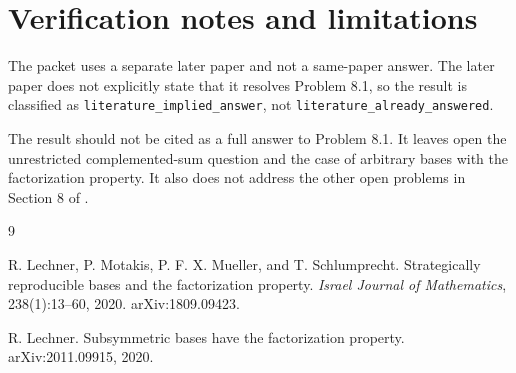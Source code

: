 \documentclass[11pt]{article}
\begin{document}
\section*{Verification notes and limitations}

The packet uses a separate later paper and not a same-paper answer.  The later
paper does not explicitly state that it resolves Problem 8.1, so the result is
classified as \texttt{literature\_implied\_answer}, not
\texttt{literature\_already\_answered}.

The result should not be cited as a full answer to Problem 8.1.  It leaves open
the unrestricted complemented-sum question and the case of arbitrary bases with
the factorization property.  It also does not address the other open problems
in Section 8 of \cite{LMMS}.

\begin{thebibliography}{9}

R. Lechner, P. Motakis, P. F. X. Mueller, and T. Schlumprecht.
\newblock Strategically reproducible bases and the factorization property.
\newblock \emph{Israel Journal of Mathematics}, 238(1):13--60, 2020.
\newblock arXiv:1809.09423.

R. Lechner.
\newblock Subsymmetric bases have the factorization property.
\newblock arXiv:2011.09915, 2020.

\end{thebibliography}
\end{document}
